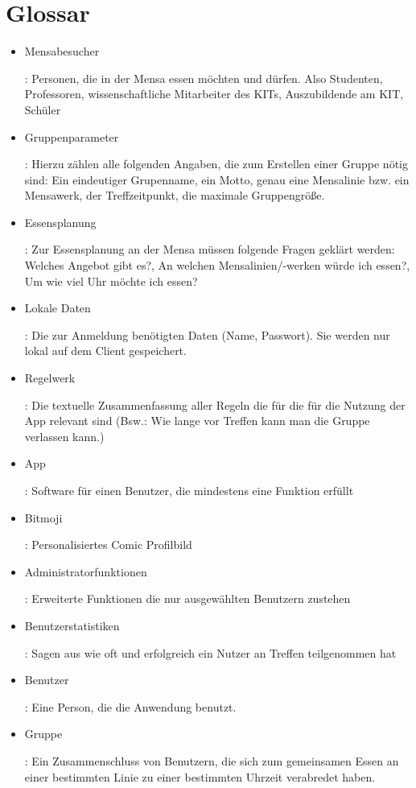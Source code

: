 \documentclass[a4paper]{scrreprt}
\begin{document}
\chapter{Glossar}
 \begin{itemize}
 \item \hypertarget{label1}{Mensabesucher}: Personen, die in der Mensa essen möchten und dürfen. Also Studenten, Professoren, wissenschaftliche Mitarbeiter des KITs, Auszubildende am KIT, Schüler
 \item \hypertarget{label2}{Gruppenparameter}: Hierzu zählen alle folgenden Angaben, die zum Erstellen einer Gruppe nötig sind: Ein eindeutiger Grupenname, ein Motto, genau eine Mensalinie bzw. ein Mensawerk, der Treffzeitpunkt, die maximale Gruppengröße.
\item \hypertarget{label3}{Essensplanung}: Zur Essensplanung an der Mensa müssen folgende Fragen geklärt werden: Welches Angebot gibt es?, An welchen Mensalinien/-werken würde ich essen?, Um wie viel Uhr möchte ich essen? 
\item \hypertarget{label4}{Lokale Daten}: Die zur Anmeldung benötigten Daten (Name, Passwort). Sie werden nur lokal auf dem Client gespeichert.
\item \hypertarget{label5}{Regelwerk}: Die textuelle Zusammenfassung aller Regeln die für die für die Nutzung der App relevant sind (Bsw.: Wie lange vor Treffen kann man die Gruppe verlassen kann.)
\item \hypertarget{label6}{App}: Software für einen Benutzer, die mindestens eine Funktion erfüllt
\item \hypertarget{label7}{Bitmoji}: Personalisiertes Comic Profilbild
\item \hypertarget{label8}{Administratorfunktionen}: Erweiterte Funktionen die nur ausgewählten Benutzern zustehen
\item \hypertarget{label9}{Benutzerstatistiken}: Sagen aus wie oft und erfolgreich ein Nutzer an Treffen teilgenommen hat 
\item \hypertarget{benutzer}{Benutzer}: Eine Person, die die Anwendung benutzt.
\item \hypertarget{gruppe}{Gruppe}: Ein Zusammenschluss von Benutzern, die sich zum gemeinsamen Essen an einer bestimmten Linie zu einer bestimmten Uhrzeit verabredet haben.
  
 \end{itemize}
 
\end{document}
